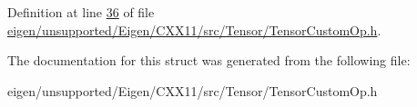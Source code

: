 Definition at line \hyperlink{eigen_2unsupported_2_eigen_2_c_x_x11_2src_2_tensor_2_tensor_custom_op_8h_source_l00036}{36} of file \hyperlink{eigen_2unsupported_2_eigen_2_c_x_x11_2src_2_tensor_2_tensor_custom_op_8h_source}{eigen/unsupported/\+Eigen/\+C\+X\+X11/src/\+Tensor/\+Tensor\+Custom\+Op.\+h}.



The documentation for this struct was generated from the following file\+:\begin{DoxyCompactItemize}
\item 
eigen/unsupported/\+Eigen/\+C\+X\+X11/src/\+Tensor/\+Tensor\+Custom\+Op.\+h\end{DoxyCompactItemize}
